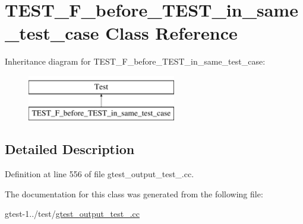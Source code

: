 \hypertarget{classTEST__F__before__TEST__in__same__test__case}{\section{\-T\-E\-S\-T\-\_\-\-F\-\_\-before\-\_\-\-T\-E\-S\-T\-\_\-in\-\_\-same\-\_\-test\-\_\-case \-Class \-Reference}
\label{d5/d7a/classTEST__F__before__TEST__in__same__test__case}
}
\-Inheritance diagram for \-T\-E\-S\-T\-\_\-\-F\-\_\-before\-\_\-\-T\-E\-S\-T\-\_\-in\-\_\-same\-\_\-test\-\_\-case\-:\begin{figure}[H]
\begin{center}
\leavevmode
\includegraphics[height=2.000000cm]{d5/d7a/classTEST__F__before__TEST__in__same__test__case}
\end{center}
\end{figure}


\subsection{\-Detailed \-Description}


\-Definition at line 556 of file gtest\-\_\-output\-\_\-test\-\_\-.\-cc.



\-The documentation for this class was generated from the following file\-:\begin{DoxyCompactItemize}
\item 
gtest-\/1../test/\hyperlink{gtest__output__test___8cc}{gtest\-\_\-output\-\_\-test\-\_\-.\-cc}\end{DoxyCompactItemize}
